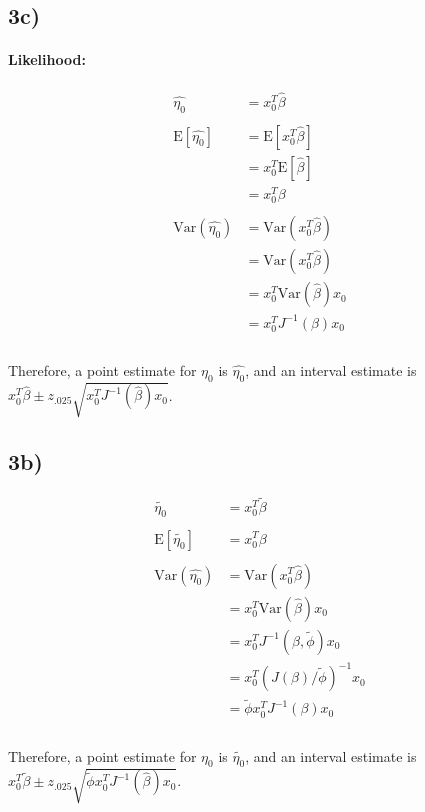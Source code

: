 \documentclass[12pt,]{article}
\let\oldparagraph\paragraph
\renewcommand{\paragraph}[1]{\oldparagraph{#1}\mbox{}}
\newcommand{\p}[1]{\left(#1\right)}
\newcommand{\bk}[1]{\left[#1\right]}
\newcommand{\E}{ \text{E} }
\newcommand{\V}{ \text{Var} }
\begin{document}
\subsection{3c)}\label{c}

\paragraph{Likelihood:}\label{likelihood}

\begin{align*}
\hat{\eta_0} &= x_0^T\hat{\beta} \\
\\
\E\bk{\hat{\eta_0}} &= \E\bk{x_0^T\hat\beta}\\
&= x_0^T\E\bk{\hat\beta}\\
&= x_0^T\beta \\
\\
\V(\hat{\eta_0}) &= \V(x_0^T\hat\beta) \\
&= \V(x_0^T\hat\beta) \\
&= x_0^T\V(\hat\beta)x_0 \\
&= x_0^TJ^{-1}(\beta)x_0 \\
\\
\end{align*}

Therefore, a point estimate for \(\eta_0\) is \(\hat{\eta_0}\), and an
interval estimate is
\(x_0^T\hat\beta \pm z_{.025} \sqrt{x_0^T J^{-1}(\hat\beta)x_0}\).

\subsection{3b)}\label{b-3}

\begin{align*}
\tilde{\eta_0} &= x_0^T\tilde{\beta} \\
\\
\E\bk{\tilde{\eta_0}} &= x_0^T\beta \\
\\
\V(\hat{\eta_0}) &= \V(x_0^T\hat\beta) \\
&= x_0^T\V(\hat\beta)x_0 \\
&= x_0^TJ^{-1}(\beta,\tilde{\phi})x_0 \\
&= x_0^T\p{J(\beta)/\tilde{\phi}}^{-1}x_0 \\
&= \tilde{\phi}x_0^T J^{-1}(\beta)x_0 \\
\\
\end{align*}

Therefore, a point estimate for \(\eta_0\) is \(\tilde{\eta_0}\), and an
interval estimate is
\(x_0^T\tilde\beta \pm z_{.025} \sqrt{\tilde\phi x_0^T J^{-1}(\hat\beta)x_0}\).
\end{document}
